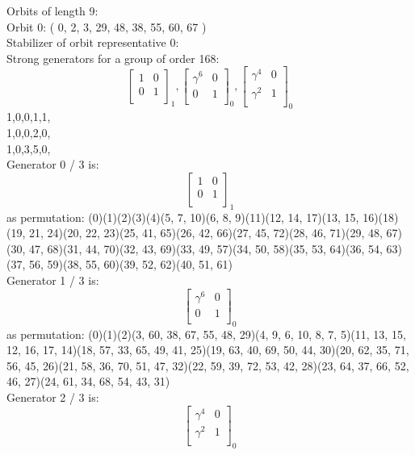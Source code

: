 Orbits of length 9:\\
Orbit 0:
( 0, 2, 3, 29, 48, 38, 55, 60, 67 )\\
Stabilizer of orbit representative 0:\\
Strong generators for a group of order 168:
$$
\left[
\begin{array}{*{2}{r}}
1 & 0\\
0 & 1\\
\end{array}
\right]
_{1}
, 
\left[
\begin{array}{*{2}{r}}
\gamma^{6} & 0\\
0 & 1\\
\end{array}
\right]
_{0}
, 
\left[
\begin{array}{*{2}{r}}
\gamma^{4} & 0\\
\gamma^{2} & 1\\
\end{array}
\right]
_{0}
$$
1,0,0,1,1,\\
1,0,0,2,0,\\
1,0,3,5,0,\\
Generator 0 / 3 is:
$$
\left[
\begin{array}{*{2}{r}}
1 & 0\\
0 & 1\\
\end{array}
\right]
_{1}
$$
as permutation:
(0)(1)(2)(3)(4)(5, 7, 10)(6, 8, 9)(11)(12, 14, 17)(13, 15, 16)(18)(19, 21, 24)(20, 22, 23)(25, 41, 65)(26, 42, 66)(27, 45, 72)(28, 46, 71)(29, 48, 67)(30, 47, 68)(31, 44, 70)(32, 43, 69)(33, 49, 57)(34, 50, 58)(35, 53, 64)(36, 54, 63)(37, 56, 59)(38, 55, 60)(39, 52, 62)(40, 51, 61)\\
Generator 1 / 3 is:
$$
\left[
\begin{array}{*{2}{r}}
\gamma^{6} & 0\\
0 & 1\\
\end{array}
\right]
_{0}
$$
as permutation:
(0)(1)(2)(3, 60, 38, 67, 55, 48, 29)(4, 9, 6, 10, 8, 7, 5)(11, 13, 15, 12, 16, 17, 14)(18, 57, 33, 65, 49, 41, 25)(19, 63, 40, 69, 50, 44, 30)(20, 62, 35, 71, 56, 45, 26)(21, 58, 36, 70, 51, 47, 32)(22, 59, 39, 72, 53, 42, 28)(23, 64, 37, 66, 52, 46, 27)(24, 61, 34, 68, 54, 43, 31)\\
Generator 2 / 3 is:
$$
\left[
\begin{array}{*{2}{r}}
\gamma^{4} & 0\\
\gamma^{2} & 1\\
\end{array}
\right]
_{0}
$$
